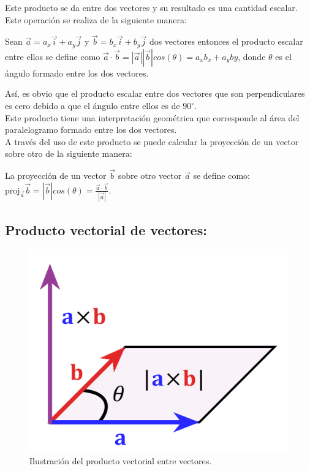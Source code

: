 Este producto se da entre dos vectores y su resultado es una cantidad escalar. Este operación se realiza de la 
siguiente manera:

\begin{tcolorbox}
Sean $\vec{a} =a_x\vec{i}+a_y\vec{j}$ y $\vec{b}=b_x\vec{i}+b_y\vec{j}$ dos vectores entonces el producto escalar 
entre ellos se define como $\vec{a}\cdot\vec{b}=|\vec{a}||\vec{b}|cos(\theta)= a_xb_x+a_yby$, donde $\theta$ es el 
ángulo formado entre los dos vectores.
\end{tcolorbox}

Así, es obvio que el producto escalar entre dos vectores que son perpendiculares es cero debido a que el ángulo entre 
ellos es de $90^\circ$.\\

Este producto tiene una interpretación geométrica que corresponde al área del paralelogramo formado entre los dos vectores.\\

A través del uso de este producto se puede calcular la proyección de un vector sobre otro de la siguiente manera:

\begin{tcolorbox}
La proyección de un vector $\vec{b}$ sobre otro vector $\vec{a}$ se define como: $\text{proj}_{\vec{a}}\vec{b} 
=|\vec{b}|cos(\theta)= \frac{\vec{a}\cdot\vec{b}}{|\vec{a}|}$.
\end{tcolorbox}

\subsection{Producto vectorial de vectores:}

\begin{figure}[H]
 \centering
 \includegraphics[scale=0.1]{images/1200px-Cross_product_parallelogram.png}
 \caption{Ilustración del producto vectorial entre vectores.}
 \label{fig:vectorial}
\end{figure}

